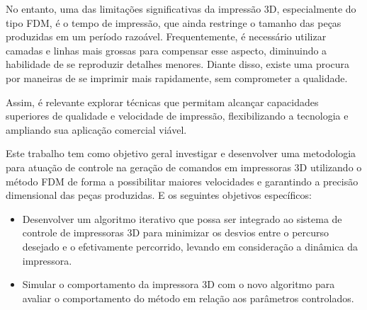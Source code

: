 No entanto, uma das limitações significativas da impressão 3D, especialmente do tipo FDM, é o tempo de
impressão, que ainda restringe o tamanho das peças produzidas em um período razoável. Frequentemente, é
necessário utilizar camadas e linhas mais grossas para compensar esse aspecto, diminuindo a habilidade de
se reproduzir detalhes menores. Diante disso, existe uma procura por maneiras de se imprimir mais rapidamente,
sem comprometer a qualidade.

Assim, é relevante explorar técnicas que permitam alcançar capacidades superiores de qualidade e
velocidade de impressão, flexibilizando a tecnologia e ampliando sua aplicação comercial viável.

Este trabalho tem como objetivo geral investigar e desenvolver uma metodologia para atuação de controle na geração de
comandos em impressoras 3D utilizando o método FDM de forma a possibilitar maiores velocidades e garantindo a precisão dimensional das peças produzidas. E os seguintes objetivos específicos: 
\begin{itemize}
    \item Desenvolver um algoritmo iterativo que possa ser integrado ao sistema de controle de impressoras 3D para minimizar os desvios entre o percurso desejado e o efetivamente percorrido, levando em consideração a dinâmica da impressora.
    \item Simular o comportamento da impressora 3D com o novo algoritmo para avaliar o comportamento do método em relação aos parâmetros controlados.
\end{itemize}


